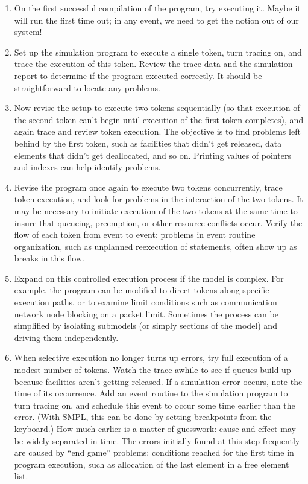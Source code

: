 \begin{enumerate}
\item On the first successful compilation of the program, try executing it.
Maybe it will run the first time out; in any event, we need to get the notion
out of our system!

\item Set up the simulation program to execute a single token, turn tracing
on, and trace the execution of this token. Review the trace data and the
simulation report to determine if the program executed correctly. It should be
straightforward to locate any problems.

\item Now revise the setup to execute two tokens sequentially (so that
execution of the second token can't begin until execution of the first token
completes), and again trace and review token execution. The objective is to
find problems left behind by the first token, such as facilities that didn't
get released, data elements that didn't get deallocated, and so on. Printing
values of pointers and indexes can help identify problems.

\item Revise the program once again to execute two tokens concurrently, trace
token execution, and look for problems in the interaction of the two tokens.
It may be necessary to initiate execution of the two tokens at the same time
to insure that queueing, preemption, or other resource conflicts occur. Verify
the flow of each token from event to event: problems in event routine
organization, such as unplanned reexecution of statements, often show up as
breaks in this flow.

\item Expand on this controlled execution process if the model is complex. For
example, the program can be modified to direct tokens along specific execution
paths, or to examine limit conditions such as communication network node
blocking on a packet limit. Sometimes the process can be simplified by
isolating submodels (or simply sections of the model) and driving them
independently.

\item When selective execution no longer turns up errors, try full execution
of a modest number of tokens. Watch the trace awhile to see if queues build up
because facilities aren't getting released. If a simulation error occurs, note
the time of its occurrence. Add an event routine to the simulation program to
turn tracing on, and schedule this event to occur some time earlier than the
error. (With SMPL, this can be done by setting breakpoints from the keyboard.)
How much earlier is a matter of guesswork: cause and effect may be widely
separated in time. The errors initially found at this step frequently are
caused by ``end game'' problems: conditions reached for the first time in
program execution, such as allocation of the last element in a free element
list.


\end{enumerate}
